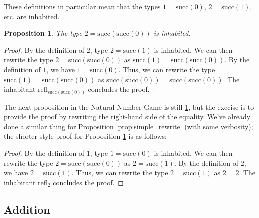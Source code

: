 \documentclass[12pt]{article}
\newtheorem{proposition}{Proposition}[section]
\theoremstyle{definition}
\theoremstyle{remark}
\begin{document}
These definitions in particular mean that the types $1 = \text{succ}(0)$, $2 = \text{succ}(1)$, etc. are inhabited.

\begin{proposition}\label{prop:two_is_succ_of_succ_of_zero}
  The type $2 = \text{succ}(\text{succ}(0))$ is inhabited.
\end{proposition}
\begin{proof}
  By the definition of $2$, type $2 = \text{succ}(1)$ is inhabited. We can then rewrite the type $2 = \text{succ}(\text{succ}(0))$ as $\text{succ}(1) = \text{succ}(\text{succ}(0))$. By the definition of $1$, we have $1 = \text{succ}(0)$. Thus, we can rewrite the type $\text{succ}(1) = \text{succ}(\text{succ}(0))$ as $\text{succ}(\text{succ}(0)) = \text{succ}(\text{succ}(0))$.
  The inhabitant $\text{refl}_{\text{succ}(\text{succ}(0))}$ concludes the proof.
\end{proof}

The next proposition in the Natural Number Game is still \ref{prop:two_is_succ_of_succ_of_zero}, but the execise is to provide the proof by rewriting the right-hand side of the equality. We've already done a similar thing for Proposition \ref{prop:simple_rewrite} (with some verbosity); the shorter-style proof for Proposition \ref{prop:two_is_succ_of_succ_of_zero} is as follows:

\begin{proof}
  By the definition of $1$, type $1 = \text{succ}(0)$ is inhabited. We can then rewrite the type $2 = \text{succ}(\text{succ}(0))$ as $2 = \text{succ}(1)$. By the definition of $2$, we have $2 = \text{succ}(1)$. Thus, we can rewrite the type $2 = \text{succ}(1)$ as $2 = 2$.
  The inhabitant $\text{refl}_{2}$ concludes the proof.
\end{proof}

\subsection{Addition}
\end{document}
